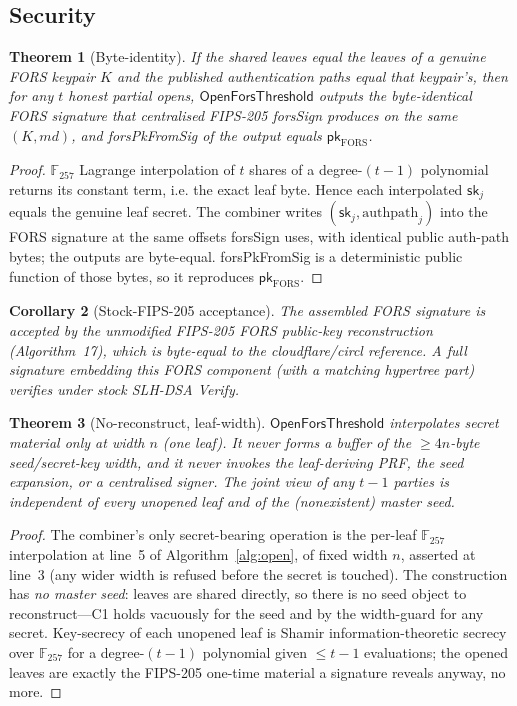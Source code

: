 \documentclass[11pt,a4paper]{article}
\newtheorem{theorem}{Theorem}
\newtheorem{corollary}[theorem]{Corollary}
\newcommand{\GF}{\mathbb{F}}
\begin{document}
\subsection{Security}
\label{sec:fors-security}

\begin{theorem}[Byte-identity]
\label{thm:byte}
If the shared leaves equal the leaves of a genuine FORS keypair $K$ and the
published authentication paths equal that keypair's, then for any $t$ honest partial
opens, $\mathsf{OpenForsThreshold}$ outputs the byte-identical FORS signature that
centralised FIPS-205 \textsf{forsSign} produces on the same $(K, md)$, and
\textsf{forsPkFromSig} of the output equals $\mathsf{pk}_{\mathrm{FORS}}$.
\end{theorem}
\begin{proof}
$\GF_{257}$ Lagrange interpolation of $t$ shares of a degree-$(t-1)$ polynomial
returns its constant term, i.e. the exact leaf byte. Hence each interpolated
$\mathsf{sk}_j$ equals the genuine leaf secret. The combiner writes
$(\mathsf{sk}_j, \text{authpath}_j)$ into the FORS signature at the same offsets
\textsf{forsSign} uses, with identical public auth-path bytes; the outputs are
byte-equal. \textsf{forsPkFromSig} is a deterministic public function of those
bytes, so it reproduces $\mathsf{pk}_{\mathrm{FORS}}$.
\end{proof}

\begin{corollary}[Stock-FIPS-205 acceptance]
The assembled FORS signature is accepted by the unmodified FIPS-205 FORS
public-key reconstruction (Algorithm~17), which is byte-equal to the cloudflare/circl
reference. A full signature embedding this FORS component (with a matching
hypertree part) verifies under stock SLH-DSA Verify.
\end{corollary}

\begin{theorem}[No-reconstruct, leaf-width]
\label{thm:noreconstruct}
$\mathsf{OpenForsThreshold}$ interpolates secret material only at width $n$ (one
leaf). It never forms a buffer of the $\geq 4n$-byte seed/secret-key width, and it
never invokes the leaf-deriving PRF, the seed expansion, or a centralised signer.
The joint view of any $t-1$ parties is independent of every unopened leaf and of the
(nonexistent) master seed.
\end{theorem}
\begin{proof}
The combiner's only secret-bearing operation is the per-leaf
$\GF_{257}$ interpolation at line~5 of Algorithm~\ref{alg:open}, of fixed width $n$,
asserted at line~3 (any wider width is refused before the secret is touched). The
construction has \emph{no master seed}: leaves are shared directly, so there is no
seed object to reconstruct---C1 holds vacuously for the seed and by the width-guard
for any secret. Key-secrecy of each unopened leaf is Shamir
information-theoretic secrecy over $\GF_{257}$ for a degree-$(t-1)$ polynomial given
$\leq t-1$ evaluations; the opened leaves are exactly the FIPS-205 one-time material
a signature reveals anyway, no more.
\end{proof}
\end{document}
